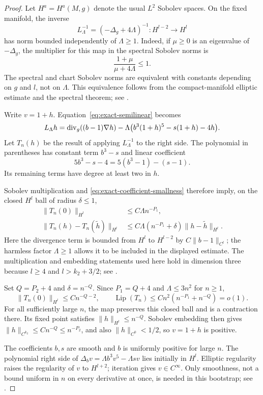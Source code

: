 \begin{proof}
Let \(H^a=H^a(M,g)\) denote the usual \(L^2\) Sobolev spaces.  On the
fixed manifold, the inverse
\[
 L_\Lambda^{-1}=(-\Delta_g+4\Lambda)^{-1}:H^{l-2}\longrightarrow H^l
\]
has norm bounded independently of \(\Lambda\ge1\).  Indeed, if
\(\mu\ge0\) is an eigenvalue of \(-\Delta_g\), the multiplier for
this map in the spectral Sobolev norms is
\[
 \frac{1+\mu}{\mu+4\Lambda}\le1.
\]
The spectral and chart Sobolev norms are equivalent with constants
depending on \(g\) and \(l\), not on \(\Lambda\).  This equivalence
follows from the compact-manifold elliptic estimate and the spectral
theorem; see \cite[Theorems 15.7 and 16.1]{DyatlovNotes}.

Write \(v=1+h\).  Equation~\eqref{eq:exact-semilinear} becomes
\begin{equation}
 L_\Lambda h
 =\operatorname{div}_g((b-1)\nabla h)
  -\Lambda\bigl(b^3(1+h)^5-s(1+h)-4h\bigr).
 \label{eq:exact-fixed-point-equation}
\end{equation}
Let \(T_n(h)\) be the result of applying \(L_\Lambda^{-1}\) to the
right side.  The polynomial in parentheses has constant term
\(b^3-s\) and linear coefficient
\[
 5b^3-s-4=5(b^3-1)-(s-1).
\]
Its remaining terms have degree at least two in \(h\).

Sobolev multiplication and \eqref{eq:exact-coefficient-smallness}
therefore imply, on the closed \(H^l\) ball of radius \(\delta\le1\),
\begin{align*}
 \|T_n(0)\|_{H^l}&\le C\Lambda n^{-P_1},\\
 \|T_n(h)-T_n(\widetilde h)\|_{H^l}
 &\le C\Lambda(n^{-P_1}+\delta)
       \|h-\widetilde h\|_{H^l}.
\end{align*}
Here the divergence term is bounded from \(H^l\) to \(H^{l-2}\)
by \(C\|b-1\|_{C^l}\); the harmless factor \(\Lambda\ge1\)
allows it to be included in the displayed estimate.  The multiplication
and embedding statements used here hold in dimension three because
\(l\ge4\) and \(l>k_2+3/2\); see
\cite[Section~1, Exercise~6, and Proposition~3.3]{TaylorSobolev}.

Set \(Q=P_2+4\) and \(\delta=n^{-Q}\).  Since \(P_1=Q+4\) and
\(\Lambda\le3n^2\) for \(n\ge1\),
\[
 \|T_n(0)\|_{H^l}\le Cn^{-Q-2},\qquad
 \operatorname{Lip}(T_n)\le Cn^2(n^{-P_1}+n^{-Q})=o(1).
\]
For all sufficiently large \(n\), the map preserves this closed ball
and is a contraction there.  Its fixed point satisfies
\(\|h\|_{H^l}\le n^{-Q}\).  Sobolev embedding then gives
\(\|h\|_{C^{k_2}}\le Cn^{-Q}\le n^{-P_2}\), and also
\(\|h\|_{C^0}<1/2\), so \(v=1+h\) is positive.

The coefficients \(b,s\) are smooth and \(b\) is uniformly positive
for large \(n\).  The polynomial right side of
\(\Delta_bv=\Lambda b^3v^5-\Lambda sv\) lies initially in \(H^l\).
Elliptic regularity raises the regularity of \(v\) to \(H^{l+2}\);
iteration gives \(v\in C^\infty\).  Only smoothness, not a bound
uniform in \(n\) on every derivative at once, is needed in this
bootstrap; see \cite[Theorems 15.1 and 15.7]{DyatlovNotes}.
\end{proof}

